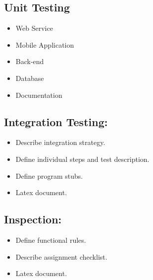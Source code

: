 \documentclass[11pt, a4paper,titlepage]{article}
\begin{document}
	\subsection{Unit Testing}
	\begin{itemize}
		\item Web Service
		\item Mobile Application
		\item Back-end
		\item Database
		\item Documentation
	\end{itemize}
	
		
		\subsection{Integration Testing:}
		\begin{itemize}
			\item Describe integration strategy.
			\item Define individual steps and test description.
			\item Define program stubs.
			\item Latex document.
		\end{itemize}
	
	
	\subsection{Inspection:}
	\begin{itemize}
		\item Define functional rules.
		\item Describe assignment checklist.
		\item Latex document.
	\end{itemize}
	\newpage
\end{document}

